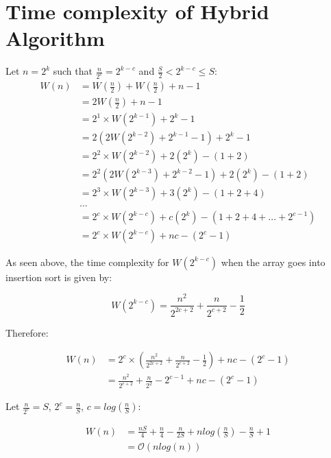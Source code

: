 \documentclass[10pt, a4paper]{article}
\begin{document}
\section{Time complexity of Hybrid Algorithm}
Let $n = 2^k$ such that $\frac{n}{2^c} = 2^{k-c}$ and $\frac{S}{2} < 2^{k-c} \leq S$:
\begin{equation*}
\begin{split}
W(n) & = W(\frac{n}{2}) + W(\frac{n}{2}) + n - 1 \\
& = 2W(\frac{n}{2}) + n - 1 \\
& = 2^1 \times W(2^{k-1}) + 2^k - 1 \\
& = 2(2W(2^{k-2}) + 2^{k-1} - 1) + 2^k - 1 \\
& = 2^2 \times W(2^{k-2}) + 2(2^k) - (1+2) \\
& = 2^2(2W(2^{k-3}) + 2^{k-2} - 1) + 2(2^k) - (1+2) \\
& = 2^3 \times W(2^{k-3}) + 3(2^k) - (1+2+4) \\
& \dots \\
& = 2^c \times W(2^{k-c}) + c(2^k) - (1+2+4+\dots+2^{c-1}) \\
& = 2^c \times W(2^{k-c}) + nc - (2^c-1) 
\end{split}
\end{equation*}

As seen above, the time complexity for $W(2^{k-c})$ when the array goes into insertion sort is given by:

\[ W(2^{k-c}) =\frac{n^2}{2^{2c+2}} + \frac{n}{2^{c+2}} - \frac{1}{2} \]

Therefore:

\begin{equation*}
\begin{split}
W(n) & = 2^c \times (\frac{n^2}{2^{2c+2}} + \frac{n}{2^{c+2}} - \frac{1}{2}) + nc - (2^c-1) \\
& = \frac{n^2}{2^{c+2}} + \frac{n}{2^2} - 2^{c-1} + nc - (2^c-1)
\end{split}
\end{equation*}

Let $\frac{n}{2^c} = S$, $2^c = \frac{n}{S}$, $c = log(\frac{n}{S})$:

\begin{equation*}
\begin{split}
W(n) & = \frac{nS}{4} + \frac{n}{4} - \frac{n}{2S} + nlog(\frac{n}{S}) - \frac{n}{S} + 1\\
& = \mathcal{O}(nlog(n))
\end{split}
\end{equation*}
\end{document}
